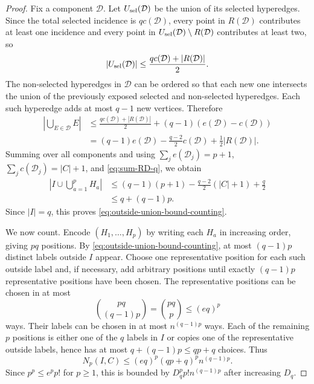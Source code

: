 \documentclass[11pt]{article}
\begin{document}
\begin{proof}
  Fix a component $\mathcal D$.  Let $U_{\rm sel}(\mathcal D)$ be the union of
  its selected hyperedges.  Since the total selected incidence is
  $q c(\mathcal D)$, every point in $R(\mathcal D)$ contributes at least one
  incidence and every point in
  $U_{\rm sel}(\mathcal D)\setminus R(\mathcal D)$ contributes at least two,
  so
  \begin{equation}\label{eq:selected-union-bound}
    |U_{\rm sel}(\mathcal D)|
    \leq
    \frac{q c(\mathcal D)+|R(\mathcal D)|}{2}.
  \end{equation}
  The non-selected hyperedges in $\mathcal D$ can be ordered so that each new
  one intersects the union of the previously exposed selected and non-selected
  hyperedges.  Each such hyperedge adds at most $q-1$ new vertices.  Therefore
  \begin{align}\label{eq:component-union-bound-counting}
    \left|\bigcup_{E\in\mathcal D}E\right|
    &\leq
    \frac{q c(\mathcal D)+|R(\mathcal D)|}{2}
    +(q-1)(e(\mathcal D)-c(\mathcal D)) \\
    &=
    (q-1)e(\mathcal D)
    -\frac{q-2}{2}c(\mathcal D)
    +\frac12|R(\mathcal D)|.
  \end{align}
  Summing over all components and using
  $\sum_j e(\mathcal D_j)=p+1$, $\sum_j c(\mathcal D_j)=|C|+1$, and
  \eqref{eq:sum-RD-q}, we obtain
  \begin{align}\label{eq:total-union-bound-counting}
    \left|I\cup\bigcup_{a=1}^pH_a\right|
    &\leq
    (q-1)(p+1)
    -\frac{q-2}{2}(|C|+1)
    +\frac q2 \\
    &\leq
    q+(q-1)p.
  \end{align}
  Since $|I|=q$, this proves \eqref{eq:outside-union-bound-counting}.

  We now count.  Encode $(H_1,\ldots,H_p)$ by writing each $H_a$ in increasing
  order, giving $pq$ positions.  By
  \eqref{eq:outside-union-bound-counting}, at most $(q-1)p$ distinct labels
  outside $I$ appear.  Choose one representative position for each such outside
  label and, if necessary, add arbitrary positions until exactly $(q-1)p$
  representative positions have been chosen.  The representative positions can
  be chosen in at most
  \begin{equation}\label{eq:representative-position-count}
    \binom{pq}{(q-1)p}
    =
    \binom{pq}{p}
    \leq
    (eq)^p
  \end{equation}
  ways.  Their labels can be chosen in at most $n^{(q-1)p}$ ways.  Each of the
  remaining $p$ positions is either one of the $q$ labels in $I$ or copies one
  of the representative outside labels, hence has at most $q+(q-1)p\leq qp+q$
  choices.  Thus
  \begin{equation}\label{eq:counting-final-before-factorial}
    N_p(I,C)
    \leq
    (eq)^p(qp+q)^p n^{(q-1)p}.
  \end{equation}
  Since $p^p\leq e^p p!$ for $p\geq1$, this is bounded by
  $D_q^p p! n^{(q-1)p}$ after increasing $D_q$.
\end{proof}
\end{document}

